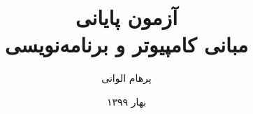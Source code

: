 \documentclass[fontsize=11pt]{article}
\title{آزمون پایانی\\مبانی کامپیوتر و برنامه‌نویسی}
\author{پرهام الوانی}
\date{بهار ۱۳۹۹}
\begin{document}
    \maketitle

    
    \pagebreak
    
    \pagebreak
    
    \pagebreak
    
    \pagebreak
    
    \pagebreak
    
    \pagebreak
    
\end{document}
